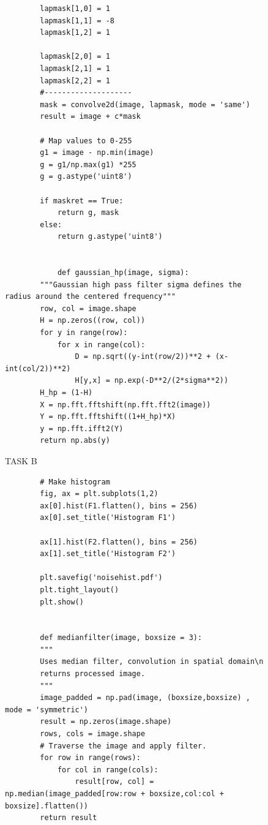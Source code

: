 {\begin{figure}[H]
\begin{lstlisting}
        lapmask[1,0] = 1
        lapmask[1,1] = -8
        lapmask[1,2] = 1

        lapmask[2,0] = 1
        lapmask[2,1] = 1
        lapmask[2,2] = 1
        #--------------------
        mask = convolve2d(image, lapmask, mode = 'same')
        result = image + c*mask

        # Map values to 0-255
        g1 = image - np.min(image)
        g = g1/np.max(g1) *255
        g = g.astype('uint8')

        if maskret == True:
            return g, mask
        else:
            return g.astype('uint8')


            def gaussian_hp(image, sigma):
        """Gaussian high pass filter sigma defines the radius around the centered frequency"""
        row, col = image.shape
        H = np.zeros((row, col))
        for y in range(row):
            for x in range(col):
                D = np.sqrt((y-int(row/2))**2 + (x-int(col/2))**2)
                H[y,x] = np.exp(-D**2/(2*sigma**2))
        H_hp = (1-H)
        X = np.fft.fftshift(np.fft.fft2(image))
        Y = np.fft.fftshift((1+H_hp)*X)
        y = np.fft.ifft2(Y)
        return np.abs(y)

    \end{lstlisting}
\caption{TASK B}
\label{TASK B}
\end{figure}





\begin{figure}[H]
    \begin{lstlisting}
        # Make histogram
        fig, ax = plt.subplots(1,2)
        ax[0].hist(F1.flatten(), bins = 256)
        ax[0].set_title('Histogram F1')
        
        ax[1].hist(F2.flatten(), bins = 256)
        ax[1].set_title('Histogram F2')
        
        plt.savefig('noisehist.pdf')
        plt.tight_layout()
        plt.show()


        def medianfilter(image, boxsize = 3):
        """
        Uses median filter, convolution in spatial domain\n
        returns processed image.
        """
        image_padded = np.pad(image, (boxsize,boxsize) , mode = 'symmetric')
        result = np.zeros(image.shape)
        rows, cols = image.shape
        # Traverse the image and apply filter.
        for row in range(rows):
            for col in range(cols):
                result[row, col] = np.median(image_padded[row:row + boxsize,col:col + boxsize].flatten())
        return result



\end{lstlisting}
\end{figure}}
